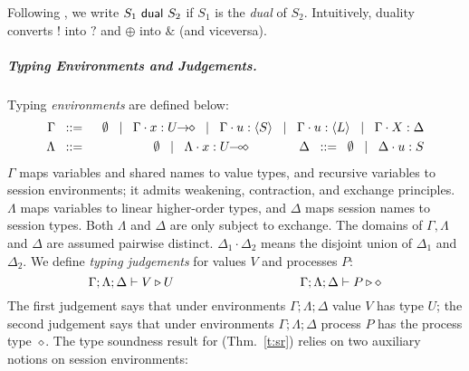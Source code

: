 \documentclass[a4paper,UKenglish]{lipics}
\theoremstyle{definition}
\begin{document}

Following \cite{onSessionDualityBDGK},
we write $S_1 \ \mathsf{dual}\  S_2$ if 
$S_1$ is the \emph{dual} of $S_2$.   
Intuitively, 
duality
converts $!$ into $?$ and $\oplus$ into $\&$ (and viceversa). 

 

\subparagraph{Typing Environments and Judgements.}
\noi Typing \emph{environments} are defined below:
\begin{eqnarray*}
	\Gamma  & \bnfis  &\emptyset \bnfbar \Gamma \cat \varp{x}: \shot{U} \bnfbar \Gamma \cat u: \chtype{S} \bnfbar \Gamma \cat u: \chtype{L} 
        \bnfbar \Gamma \cat \rvar{X}: \Delta \\
	\Lambda &\bnfis & \emptyset \bnfbar \Lambda \cat \AT{x}{\lhot{U}}
	\qquad\qquad
	\Delta  \bnfis  \emptyset \bnfbar \Delta \cat \AT{u}{S}
\end{eqnarray*}
\noi 
$\Gamma$ maps variables and shared names to value types, and recursive 
variables to session environments;  
it admits weakening, contraction, and exchange principles.
$\Lambda$ maps variables to 
 linear %
higher-order
types, and $\Delta$ maps
session names to session types. 
Both $\Lambda$ and $\Delta$ %
are
only subject to exchange.  
The domains of $\Gamma,
\Lambda$ and $\Delta$ are assumed pairwise distinct. 
$\Delta_1\cdot \Delta_2$ means 
the disjoint union of $\Delta_1$ and $\Delta_2$.  
We define \emph{typing judgements} for values $V$
and processes $P$:
	$$\Gamma; \Lambda; \Delta \vdash V \triangleright U \qquad \qquad \qquad \qquad \qquad \Gamma; \Lambda; \Delta \vdash P \triangleright \diamond$$
\noi The first judgement
says that under environments $\Gamma; \Lambda; \Delta$ value $V$
has type $U$; the second judgement says that under
environments $\Gamma; \Lambda; \Delta$ process $P$ has the process type~$\diamond$.
The type soundness result for \HOp (Thm.~\ref{t:sr})
relies on two auxiliary notions on session environments: 
\end{document}
